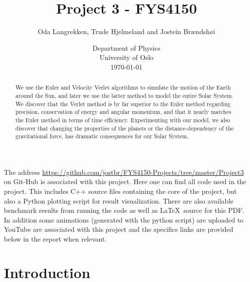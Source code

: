 \documentclass[12pt]{article}
\numberwithin{figure}{section}
\numberwithin{table}{section}
\begin{document}
\begin{titlepage}
\title{Project 3 - FYS4150}
\author{Oda Langrekken, Trude Hjelmeland and Jostein Brændshøi}
\date{
    Department of Physics\\%
    University of Oslo\\[2ex]%
    \today
}
\clearpage
\maketitle
\thispagestyle{empty}

\begin{abstract}
\noindent We use the Euler and Velocity Verlet algorithms to simulate the motion of the Earth around the Sun, and later we use the latter method to model the entire Solar System. We discover that the Verlet method is by far superior to the Euler method regarding precision, conservation of energy and angular momentum, and that it nearly matches the Euler method in terms of time efficiency. Experimenting with our model, we also discover that changing the properties of the planets or the distance-dependency of the gravitational force, has dramatic consequences for our Solar System.
\end{abstract}
\vspace{2.00cm}

\noindent The address \url{https://github.com/jostbr/FYS4150-Projects/tree/master/Project3} on Git-Hub is associated with this project. Here one can find all code used in the project. This includes C++ source files containing the core of the project, but also a Python plotting script for result visualization. There are also available benchmark results from running the code as well as \LaTeX \ source for this PDF. In addition some animations (generated with the python script) are uploaded to YouTube are associated with this project and the specifics links are provided below in the report when relevant.

\end{titlepage}
\pagebreak

\tableofcontents
\pagebreak


\section{Introduction}
\end{document}
